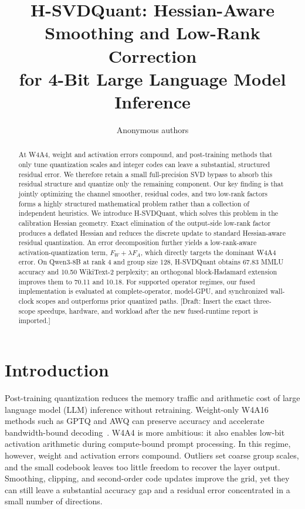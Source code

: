 \documentclass{article}
\title{H-SVDQuant: Hessian-Aware Smoothing and Low-Rank Correction\\
for 4-Bit Large Language Model Inference}
\author{Anonymous authors}
\newcommand{\method}{H-SVDQuant}
\newcommand{\draftnote}[1]{\textcolor{red!70!black}{[Draft: #1]}}
\begin{document}
\maketitle

\begin{abstract}
At W4A4, weight and activation errors compound, and post-training methods that
only tune quantization scales and integer codes can leave a substantial,
structured residual error. We therefore retain a small full-precision SVD
bypass to absorb this residual structure and quantize only the remaining
component. Our key finding is that jointly optimizing the
channel smoother, residual codes, and two low-rank factors forms a highly
structured mathematical problem rather than a collection of independent
heuristics. We introduce \method{}, which solves this problem in the calibration
Hessian geometry. Exact elimination of the output-side low-rank factor produces
a deflated Hessian and reduces the discrete update to standard Hessian-aware
residual quantization. An error decomposition further yields a low-rank-aware
activation-quantization term, $F_W+\lambda F_A$, which directly targets the
dominant W4A4 error. On Qwen3-8B at rank 4 and group size 128, \method{} obtains
67.83 MMLU accuracy and 10.50 WikiText-2 perplexity; an orthogonal block-Hadamard
extension improves them to 70.11 and 10.18. For supported operator regimes, our
fused implementation is evaluated at complete-operator, model-GPU, and
synchronized wall-clock scopes and outperforms prior quantized paths.
\draftnote{Insert the exact three-scope speedups, hardware, and workload after
the new fused-runtime report is imported.}
\end{abstract}

\section{Introduction}

Post-training quantization reduces the memory traffic and arithmetic cost of
large language model (LLM) inference without retraining. Weight-only W4A16
methods such as GPTQ and AWQ can preserve accuracy and accelerate
bandwidth-bound decoding~\citep{frantar2022gptq,lin2023awq}. W4A4 is more
ambitious: it also enables low-bit activation arithmetic during compute-bound
prompt processing. In this regime, however, weight and activation errors
compound. Outliers set coarse group scales, and the small codebook leaves too
little freedom to recover the layer output. Smoothing, clipping, and
second-order code updates improve the grid, yet they can still leave a
substantial accuracy gap and a residual error concentrated in a small number of
directions.
\end{document}
